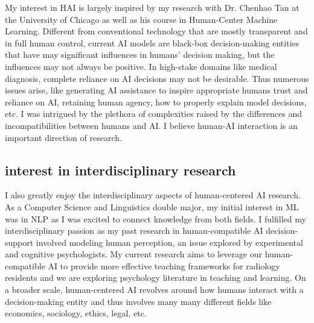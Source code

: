My interest in HAI is largely inspired by my research with Dr. Chenhao Tan at the University of Chicago as well as his course in Human-Center Machine Learning. Different from conventional technology that are mostly transparent and in full human control, current AI models are black-box decision-making entities that have may significant influences in humans' decision making, but the influences may not always be positive. In high-stake domains like medical diagnosis, complete reliance on AI decisions may not be desirable. Thus numerous issues arise, like generating AI assistance to inspire appropriate humans trust and reliance on AI, retaining human agency, how to properly explain model decisions, etc. I was intrigued by the plethora of complexities raised by the differences and incompatibilities between humans and AI. I believe human-AI interaction is an important direction of research. 



\subsection{interest in interdisciplinary research}
I also greatly enjoy the interdisciplinary aspects of human-centered AI research. As a Computer Science and Linguistics double major, my initial interest in ML was in NLP as I was excited to connect knowledge from both fields. I fulfilled my interdisciplinary passion as my past research in human-compatible AI decision-support involved modeling human perception, an issue explored by experimental and cognitive psychologists. My current research aims to leverage our human-compatible AI to provide more effective teaching frameworks for radiology residents and we are exploring psychology literature in teaching and learning. On a broader scale, human-centered AI revolves around how humans interact with a decision-making entity and thus involves many many different fields like economics, sociology, ethics, legal, etc.
